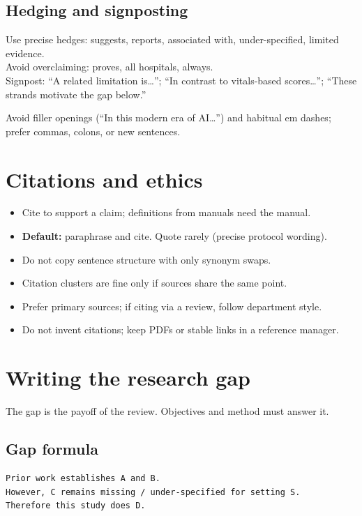 \documentclass[11pt,a4paper]{article}
\begin{document}
\subsection{Hedging and signposting}
Use precise hedges: suggests, reports, associated with, under-specified, limited evidence.\\
Avoid overclaiming: proves, all hospitals, always.\\
Signpost: ``A related limitation is\ldots''; ``In contrast to vitals-based scores\ldots''; ``These strands motivate the gap below.''

Avoid filler openings (``In this modern era of AI\ldots'') and habitual em dashes; prefer commas, colons, or new sentences.

\section{Citations and ethics}

\begin{itemize}
  \item Cite to support a claim; definitions from manuals need the manual.
  \item \textbf{Default:} paraphrase and cite. Quote rarely (precise protocol wording).
  \item Do not copy sentence structure with only synonym swaps.
  \item Citation clusters are fine only if sources share the same point.
  \item Prefer primary sources; if citing via a review, follow department style.
  \item Do not invent citations; keep PDFs or stable links in a reference manager.
\end{itemize}

\section{Writing the research gap}
\label{sec:gap}

The gap is the payoff of the review. Objectives and method must answer it.

\subsection{Gap formula}
\begin{lstlisting}
Prior work establishes A and B.
However, C remains missing / under-specified for setting S.
Therefore this study does D.
\end{lstlisting}
\end{document}

